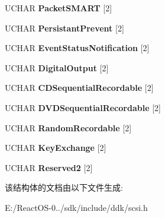 \begin{DoxyCompactItemize}
U\+C\+H\+AR {\bfseries Packet\+S\+M\+A\+RT} \mbox{[}2\mbox{]}
\item 
\mbox{\label{struct___c_d_v_d___f_e_a_t_u_r_e___s_e_t___p_a_g_e_aae1fc67c0c4e5bc2f3f940cb1801b3fe}} 
U\+C\+H\+AR {\bfseries Persistant\+Prevent} \mbox{[}2\mbox{]}
\item 
\mbox{\label{struct___c_d_v_d___f_e_a_t_u_r_e___s_e_t___p_a_g_e_a19ad61604e76356961db34c9768ac998}} 
U\+C\+H\+AR {\bfseries Event\+Status\+Notification} \mbox{[}2\mbox{]}
\item 
\mbox{\label{struct___c_d_v_d___f_e_a_t_u_r_e___s_e_t___p_a_g_e_a4166cda5facb686c003c058af9a91c65}} 
U\+C\+H\+AR {\bfseries Digital\+Output} \mbox{[}2\mbox{]}
\item 
\mbox{\label{struct___c_d_v_d___f_e_a_t_u_r_e___s_e_t___p_a_g_e_a31124b8a4138c22885de247d7aca43f5}} 
U\+C\+H\+AR {\bfseries C\+D\+Sequential\+Recordable} \mbox{[}2\mbox{]}
\item 
\mbox{\label{struct___c_d_v_d___f_e_a_t_u_r_e___s_e_t___p_a_g_e_a468b11a651c8ba3ec14be3f31e4566c1}} 
U\+C\+H\+AR {\bfseries D\+V\+D\+Sequential\+Recordable} \mbox{[}2\mbox{]}
\item 
\mbox{\label{struct___c_d_v_d___f_e_a_t_u_r_e___s_e_t___p_a_g_e_a9fb88ba6badfec2fb435b8b4aaeb2452}} 
U\+C\+H\+AR {\bfseries Random\+Recordable} \mbox{[}2\mbox{]}
\item 
\mbox{\label{struct___c_d_v_d___f_e_a_t_u_r_e___s_e_t___p_a_g_e_a2811a5875af04543d7778e550333fdaa}} 
U\+C\+H\+AR {\bfseries Key\+Exchange} \mbox{[}2\mbox{]}
\item 
\mbox{\label{struct___c_d_v_d___f_e_a_t_u_r_e___s_e_t___p_a_g_e_a0d48fa178b3d1e93ebf107e1d75487fd}} 
U\+C\+H\+AR {\bfseries Reserved2} \mbox{[}2\mbox{]}
\end{DoxyCompactItemize}


该结构体的文档由以下文件生成\+:\begin{DoxyCompactItemize}
\item 
E\+:/\+React\+O\+S-\/0../sdk/include/ddk/scsi.\+h\end{DoxyCompactItemize}
